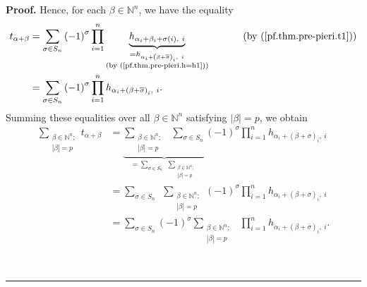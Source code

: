 \documentclass[numbers=enddot,12pt,final,onecolumn,notitlepage,english]{scrartcl}%
\theoremstyle{definition}
\newenvironment{proof}[1][Proof]{\noindent\textbf{#1.} }{\ \rule{0.5em}{0.5em}}
\let\sumnonlimits\sum
\let\prodnonlimits\prod
\renewcommand{\sum}{\sumnonlimits\limits}
\renewcommand{\prod}{\prodnonlimits\limits}
\newenvironment{verlong}{}{}
\begin{document}
\begin{verlong}
\begin{proof}
Hence, for each $\beta\in\mathbb{N}^{n}$, we have the equality%
\begin{align*}
t_{\alpha+\beta}  &  =\sum_{\sigma\in S_{n}}\left(  -1\right)  ^{\sigma}%
\prod_{i=1}^{n}\underbrace{h_{\alpha_{i}+\beta_{i}+\sigma\left(  i\right)
,\ i}}_{\substack{=h_{\alpha_{i}+\left(  \beta+\overline{\sigma}\right)
_{i},\ i}\\\text{(by (\ref{pf.thm.pre-pieri.h=h1}))}}%
}\ \ \ \ \ \ \ \ \ \ \left(  \text{by (\ref{pf.thm.pre-pieri.t1})}\right) \\
&  =\sum_{\sigma\in S_{n}}\left(  -1\right)  ^{\sigma}\prod_{i=1}^{n}%
h_{\alpha_{i}+\left(  \beta+\overline{\sigma}\right)  _{i},\ i}.
\end{align*}
Summing these equalities over all $\beta\in\mathbb{N}^{n}$ satisfying
$\left\vert \beta\right\vert =p$, we obtain%
\begin{align}
\sum_{\substack{\beta\in\mathbb{N}^{n};\\\left\vert \beta\right\vert
=p}}t_{\alpha+\beta}  &  =\underbrace{\sum_{\substack{\beta\in\mathbb{N}%
^{n};\\\left\vert \beta\right\vert =p}}\ \ \sum_{\sigma\in S_{n}}}%
_{=\sum_{\sigma\in S_{n}}\ \ \sum_{\substack{\beta\in\mathbb{N}^{n}%
;\\\left\vert \beta\right\vert =p}}}\left(  -1\right)  ^{\sigma}\prod
_{i=1}^{n}h_{\alpha_{i}+\left(  \beta+\overline{\sigma}\right)  _{i}%
,\ i}\nonumber\\
&  =\sum_{\sigma\in S_{n}}\ \ \sum_{\substack{\beta\in\mathbb{N}%
^{n};\\\left\vert \beta\right\vert =p}}\left(  -1\right)  ^{\sigma}\prod
_{i=1}^{n}h_{\alpha_{i}+\left(  \beta+\overline{\sigma}\right)  _{i}%
,\ i}\nonumber\\
&  =\sum_{\sigma\in S_{n}}\left(  -1\right)  ^{\sigma}\sum_{\substack{\beta
\in\mathbb{N}^{n};\\\left\vert \beta\right\vert =p}}\ \ \prod_{i=1}%
^{n}h_{\alpha_{i}+\left(  \beta+\overline{\sigma}\right)  _{i},\ i}.
\label{pf.thm.pre-pieri.sumt=1}%
\end{align}



\end{proof}
\end{verlong}
\end{document}
